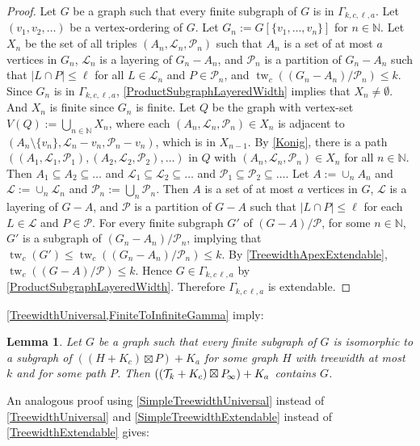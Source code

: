\documentclass[a4paper,11pt]{article}
\theoremstyle{plain}
\newtheorem{lem}[thm]{Lemma}
\theoremstyle{definition}
\renewcommand{\leq}{\leqslant}
\DeclareMathOperator{\tw}{tw}
\newcommand{\PP}{P_{\hspace{-0.25ex}\infty}}
\newcommand{\LL}{\mathcal{L}}
\newcommand{\TT}{\mathcal{T}}
\newcommand{\NN}{\mathbb{N}}
\newcommand{\PART}{\mathcal{P}}
\begin{document}
\begin{proof} 
Let $G$ be a graph such that every finite subgraph of $G$ is in $\Gamma_{k,c,\ell,a}$. Let $(v_1,v_2,\dots)$ be a vertex-ordering of $G$. Let $G_n := G[ \{v_1,\dots,v_n\}]$ for $n\in\NN$. Let $X_n$ be the set of all triples $(A_n,\LL_n,\PART_n)$ such that $A_n$ is a set of at most $a$ vertices in $G_n$, $\LL_n$ is a layering of $G_n-A_n$, and $\PART_n$ is a partition of $G_n-A_n$ such that $|L\cap P|\leq \ell$ for all $L\in\LL_n$ and $P\in \PART_n$, and $\tw_c((G_n-A_n)/\PART_n)\leq k$. Since $G_n$ is in $\Gamma_{k,c,\ell,a}$, \cref{ProductSubgraphLayeredWidth} implies that $X_n\neq\emptyset$. And $X_n$ is finite since $G_n$ is finite. Let $Q$ be the graph with vertex-set $V(Q):= \bigcup_{n\in\mathbb{N}} X_n$, where each $(A_n,\LL_n,\PART_n)\in X_n$ is adjacent to $(A_n\setminus \{v_n\},\LL_n-v_n,\PART_n-v_n)$, which is in $X_{n-1}$. By \cref{Konig}, there is a path $((A_1,\LL_1,\PART_1),(A_2,\LL_2,\PART_2),\dots)$ in $Q$ with $(A_n,\LL_n,\PART_n)\in X_n$ for all $n\in\NN$.  Then  $A_1\subseteq A_2\subseteq\dots$  and $\LL_1\subseteq \LL_2\subseteq\dots$  and $\PART_1\subseteq \PART_2\subseteq\dots$. Let $A:=\cup_n A_n$ and $\LL:=\cup_n \LL_n$ and $\PART_n:= \bigcup_n \PART_n$. Then $A$ is a set of at most $a$ vertices in $G$, $\LL$ is a layering of $G-A$, and $\PART$ is a partition of $G-A$ such that $|L\cap P|\leq \ell$ for each $L\in\LL$ and $P\in\PART$. For every finite subgraph $G'$ of $(G-A)/\PART$, for some $n\in\NN$, $G'$ is a subgraph of $(G_n-A_n)/\PART_n$, implying that $\tw_c(G') \leq \tw_c((G_n-A_n)/\PART_n) \leq k$. By \cref{TreewidthApexExtendable}, $\tw_c((G-A)/\PART)\leq k$. Hence $G\in \Gamma_{k,c\,\ell,a}$ by \cref{ProductSubgraphLayeredWidth}. Therefore $\Gamma_{k,c\,\ell,a}$ is extendable.  
\end{proof}

\cref{TreewidthUniversal,FiniteToInfiniteGamma} imply:

\begin{lem}
\label{FiniteToInfiniteProduct}
Let $G$ be a graph such that every finite subgraph of $G$ is isomorphic to a subgraph of $( (H+K_c) \boxtimes P)+K_a$ for some graph $H$ with treewidth at most $k$ and for some path $P$. Then $( (\TT_k + K_c) \boxtimes \PP)+K_a$ contains $G$.
\end{lem}

An analogous proof using \cref{SimpleTreewidthUniversal} instead of 
\cref{TreewidthUniversal} and \cref{SimpleTreewidthExtendable} instead of \cref{TreewidthExtendable} gives:
\end{document}
